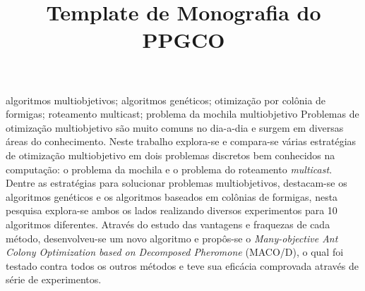 \documentclass[dissertmst]{ppgco}
\title{Template de Monografia do PPGCO}
\begin{document}
\pretextual

\maketitle






\begin{resumo}{algoritmos multiobjetivos; algoritmos genéticos; otimização por colônia de formigas; roteamento multicast; problema da mochila multiobjetivo}
	Problemas de otimização multiobjetivo são muito comuns no dia-a-dia e surgem em diversas áreas do conhecimento. Neste trabalho explora-se e compara-se várias estratégias de otimização multiobjetivo em dois problemas discretos bem conhecidos na computação: o problema da mochila e o problema do roteamento \textit{multicast}. Dentre as estratégias para solucionar problemas multiobjetivos, destacam-se os algoritmos genéticos e os algoritmos baseados em colônias de formigas, nesta pesquisa explora-se ambos os lados realizando diversos experimentos para 10 algoritmos diferentes. Através do estudo das vantagens e fraquezas de cada método, desenvolveu-se um novo algoritmo e propôs-se o \textit{Many-objective Ant Colony Optimization based on Decomposed Pheromone} (MACO/D), o qual foi testado contra todos os outros métodos e teve sua eficácia comprovada através de série de experimentos.
\end{resumo}
\end{document}
